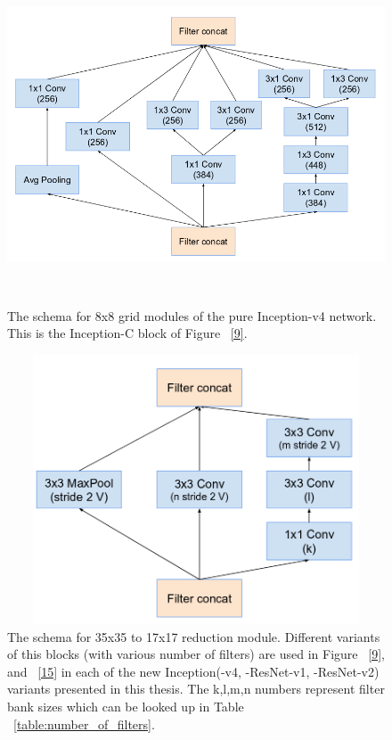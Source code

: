 \documentclass[a4paper,12pt, twoside]{NITKReport}
\begin{document}
 \begin{figure}
 \centering
 
    \includegraphics[height=10cm,width=16cm]{figure6.png}
    \caption{The schema for 8x8 grid modules of the pure Inception-v4 network. This is the Inception-C block of Figure ~\ref{9}.~\cite{szegedy2017inception}}
    \label{6}
  
\end{figure}

\begin{figure}[h]
  \centering
  
    \includegraphics[height=8cm,width=15cm]{figure7.png}
    \caption{The schema for 35x35 to 17x17 reduction module. Different variants of this blocks (with various number of filters) are used in Figure ~\ref{9}, and ~\ref{15} in each of the new Inception(-v4, -ResNet-v1, -ResNet-v2) variants presented in this thesis. The k,l,m,n numbers represent filter bank sizes which can be looked up in Table ~\ref{table:number_of_filters}.~\cite{szegedy2017inception}}
    \label{7}
  
 \end{figure}
 
\end{document}
